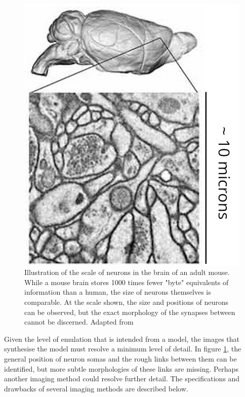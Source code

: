 \begin{figure}[h]
    \centering
    \includegraphics[scale=2]{figures/images/enlarge.jpg}
    \caption[Illustration of the scale of neurons in the brain of an adult mouse.]
    {Illustration of the scale of neurons in the brain of an adult mouse. While a mouse brain stores 1000 times fewer "byte" equivalents of information than a human, the size of neurons themselves is comparable. At the scale shown, the size and positions of neurons can be observed, but the exact morphology of the synapses between cannot be discerned. Adapted from \autocite[fig. 1]{mikula_progress_2016}}
    \label{scaleexample}
\end{figure}
\vspace{1ex}

Given the level of emulation that is intended from a model, the images that
synthesise the model must resolve a minimum level of detail. In figure
\ref{scaleexample}, the general position of neuron somas 
and the rough links between them can be identified, but more subtle morphologies
of these links are missing. Perhaps another imaging method could resolve further
detail. The specifications and drawbacks of several imaging methods are
described below.

